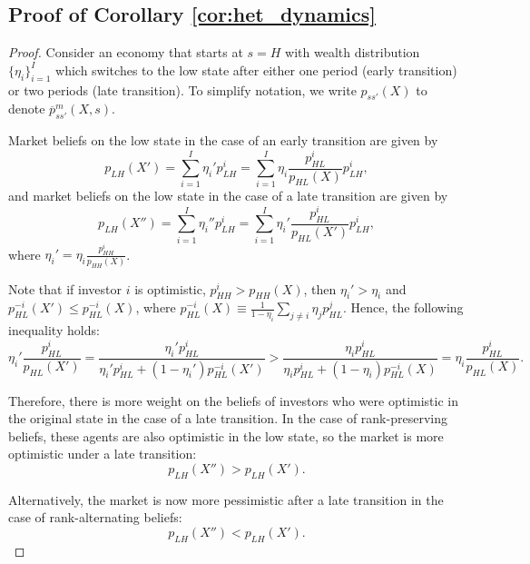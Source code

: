 \subsection{Proof of Corollary \ref{cor:het_dynamics}}\label{app: proof_cor_het_dynamics}
\begin{proof}
Consider an economy that starts at $s = H$ with wealth distribution $\{\eta_i\}_{i=1}^I$ which switches to the low state after either one period (early transition) or two periods (late transition). 
To simplify notation, we write $p_{ss'}(X)$ to denote $\overline{p}^m_{ss'}(X,s)$.

Market beliefs on the low state in the case of an early transition are given by
\begin{equation}
    p_{LH}(X') = \sum_{i=1}^I \eta_i' p_{LH}^i = \sum_{i=1}^I \eta_i \frac{p_{HL}^i}{p_{HL}(X)} p_{LH}^i,
\end{equation}
and market beliefs on the low state in the case of a late transition are given by
\begin{equation}
    p_{LH}(X'') = \sum_{i=1}^I \eta_i'' p_{LH}^i = \sum_{i=1}^I \eta_i' \frac{p_{HL}^i}{p_{HL}(X')} p_{LH}^i,
\end{equation}
where $\eta_i' = \eta_i \frac{p_{HH}^i}{p_{HH}(X)}$. 


Note that if investor $i$ is optimistic,  $p_{HH}^i > p_{HH}(X)$, then $\eta_i' > \eta_i$ and $p_{HL}^{-i}(X') \leq p_{HL}^{-i}(X) $, where $p_{HL}^{-i}(X) \equiv \frac{1}{1-\eta_i}\sum_{j\neq i} \eta_j p_{HL}^j$. 
Hence, the following inequality holds:
\begin{equation}
  \eta_i' \frac{p_{HL}^i}{p_{HL}(X')} =  \frac{\eta_i' p_{HL}^i}{\eta_i' p_{HL}^i + (1-\eta_i') p_{HL}^{-i}(X') } > 
  \frac{\eta_i p_{HL}^i}{\eta_i p_{HL}^i + (1-\eta_i) p_{HL}^{-i}(X) } =  \eta_i \frac{p_{HL}^i}{p_{HL}(X)}. 
\end{equation}

Therefore, there is more weight on the beliefs of investors who were optimistic in the original state in the case of a late transition. In the case of rank-preserving beliefs, these agents are also optimistic in the low state, so the market is more optimistic under a late transition:
\begin{equation}
    p_{LH}(X'') > p_{LH}(X'). 
\end{equation}

Alternatively, the market is now more pessimistic after a late transition in the case of rank-alternating beliefs:
\begin{equation}
    p_{LH}(X'') < p_{LH}(X'). 
\end{equation}


\end{proof}
